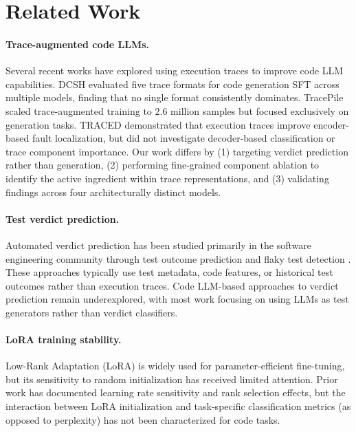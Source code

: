 \documentclass[11pt]{article}
\begin{document}
\section{Related Work}
\label{sec:related}

\paragraph{Trace-augmented code LLMs.}
Several recent works have explored using execution traces to improve code LLM capabilities. DCSH \citep{ni2024dcsh} evaluated five trace formats for code generation SFT across multiple models, finding that no single format consistently dominates. TracePile \citep{ding2025tracepile} scaled trace-augmented training to 2.6 million samples but focused exclusively on generation tasks. TRACED \citep{traced2024} demonstrated that execution traces improve encoder-based fault localization, but did not investigate decoder-based classification or trace component importance. Our work differs by (1) targeting verdict prediction rather than generation, (2) performing fine-grained component ablation to identify the active ingredient within trace representations, and (3) validating findings across four architecturally distinct models.

\paragraph{Test verdict prediction.}
Automated verdict prediction has been studied primarily in the software engineering community through test outcome prediction and flaky test detection \citep{lam2019flaky,parry2022flaky}. These approaches typically use test metadata, code features, or historical test outcomes rather than execution traces. Code LLM-based approaches to verdict prediction remain underexplored, with most work focusing on using LLMs as test generators rather than verdict classifiers.

\paragraph{LoRA training stability.}
Low-Rank Adaptation (LoRA) \citep{hu2022lora} is widely used for parameter-efficient fine-tuning, but its sensitivity to random initialization has received limited attention. Prior work has documented learning rate sensitivity \citep{dettmers2023qlora} and rank selection effects, but the interaction between LoRA initialization and task-specific classification metrics (as opposed to perplexity) has not been characterized for code tasks.
\end{document}
